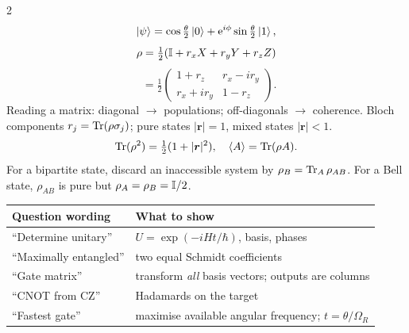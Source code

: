 \begin{multicols}{2}
\[\left\lvert \psi\right\rangle=\cos\tfrac\theta2\left\lvert 0\right\rangle+\mathrm e^{i\phi}\sin\tfrac\theta2\left\lvert 1\right\rangle,\]
\[\rho=\tfrac12(\mathbb I+r_xX+r_yY+r_zZ)\]
\[\phantom{\rho}=\tfrac12\begin{pmatrix}1+r_z&r_x-ir_y\\r_x+ir_y&1-r_z\end{pmatrix}.\]
Reading a matrix: diagonal $\to$ populations; off-diagonals $\to$ coherence. Bloch components $r_j=\operatorname{Tr}(\rho\sigma_j)$; pure states $|\bm r|=1$, mixed states $|\bm r|<1$.
\[\operatorname{Tr}(\rho^2)=\tfrac12(1+|\bm r|^2),\quad \langle A\rangle=\operatorname{Tr}(\rho A).\]
For a bipartite state, discard an inaccessible system by $\rho_B=\operatorname{Tr}_A\rho_{AB}$. For a Bell state, $\rho_{AB}$ is pure but $\rho_A=\rho_B=\mathbb I/2$.

\begin{tabularx}{\linewidth}{@{}p{.36\linewidth}X@{}}\toprule
Question wording & What to show \\ \midrule
``Determine unitary'' & $U=\exp(-iHt/\hbar)$, basis, phases \\
``Maximally entangled'' & two equal Schmidt coefficients \\
``Gate matrix'' & transform \emph{all} basis vectors; outputs are columns \\
``CNOT from CZ'' & Hadamards on the target \\
``Fastest gate'' & maximise available angular frequency; $t=\theta/\Omega_R$ \\
\bottomrule\end{tabularx}
\end{multicols}